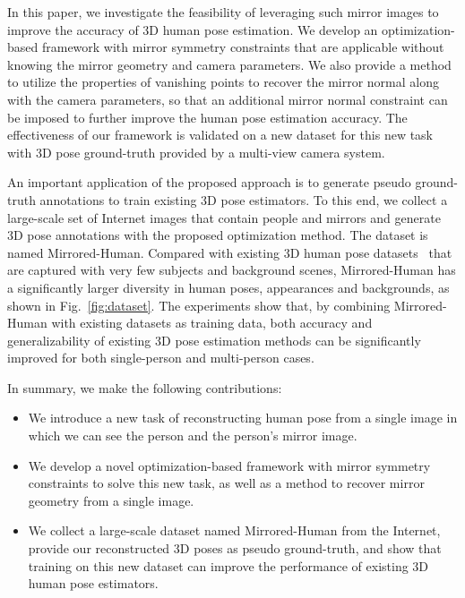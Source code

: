 In this paper, we investigate the feasibility of leveraging such mirror images to improve the accuracy of 3D human pose estimation. We develop an optimization-based framework with mirror symmetry constraints that are applicable without knowing the mirror geometry and camera parameters. We also provide a method to utilize the properties of vanishing points to recover the mirror normal along with the camera parameters, so that an additional mirror normal constraint can be imposed to further improve the human pose estimation accuracy. The effectiveness of our framework is validated on a new dataset for this new task with 3D pose ground-truth provided by a multi-view camera system. 


An important application of the proposed approach is to generate pseudo ground-truth annotations to train existing 3D pose estimators. To this end, we collect a large-scale set of Internet images that contain people and mirrors and generate 3D pose annotations with the proposed optimization method. The dataset is named Mirrored-Human.  
Compared with existing 3D human pose datasets~\cite{h36m_pami,mono-3dhp2017,vonMarcard2018} that are captured with very few subjects and background scenes, Mirrored-Human has a significantly larger diversity in human poses, appearances and backgrounds, as shown in Fig.~\ref{fig:dataset}. The experiments show that, by combining Mirrored-Human with existing datasets as training data, both accuracy and generalizability of existing 3D pose estimation methods can be significantly improved for both single-person and multi-person cases.   

In summary, we make the following contributions:
\begin{itemize}
    \item We introduce a new task of reconstructing  human pose from a single image in which we can see the person and the person's mirror image. 
    \item We develop a novel optimization-based framework with mirror symmetry constraints to solve this new task, as well as a method to recover mirror geometry from a single image.
    \item We collect a large-scale dataset named Mirrored-Human from the Internet, provide our reconstructed 3D poses as pseudo ground-truth, and show that training on this new dataset can improve the performance of existing 3D human pose estimators. 
\end{itemize}






